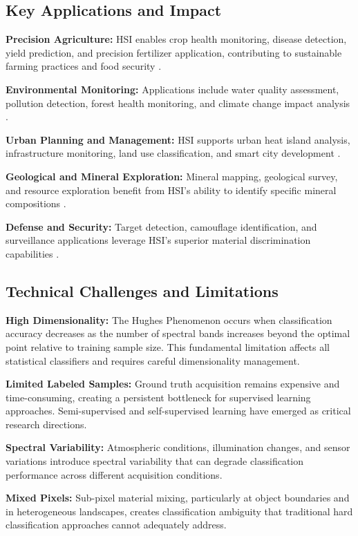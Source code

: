 \documentclass[journal]{IEEEtran}
\begin{document}
\subsection{Key Applications and Impact}

\textbf{Precision Agriculture:} HSI enables crop health monitoring, disease detection, yield prediction, and precision fertilizer application, contributing to sustainable farming practices and food security \cite{gewali2018machine}.

\textbf{Environmental Monitoring:} Applications include water quality assessment, pollution detection, forest health monitoring, and climate change impact analysis \cite{gewali2018machine}.

\textbf{Urban Planning and Management:} HSI supports urban heat island analysis, infrastructure monitoring, land use classification, and smart city development \cite{li2017deep}.

\textbf{Geological and Mineral Exploration:} Mineral mapping, geological survey, and resource exploration benefit from HSI's ability to identify specific mineral compositions \cite{roy2020hybridsn}.

\textbf{Defense and Security:} Target detection, camouflage identification, and surveillance applications leverage HSI's superior material discrimination capabilities \cite{roy2020hybridsn}.

\subsection{Technical Challenges and Limitations}

\textbf{High Dimensionality:} The Hughes Phenomenon occurs when classification accuracy decreases as the number of spectral bands increases beyond the optimal point relative to training sample size. This fundamental limitation affects all statistical classifiers and requires careful dimensionality management.

\textbf{Limited Labeled Samples:} Ground truth acquisition remains expensive and time-consuming, creating a persistent bottleneck for supervised learning approaches. Semi-supervised and self-supervised learning have emerged as critical research directions.

\textbf{Spectral Variability:} Atmospheric conditions, illumination changes, and sensor variations introduce spectral variability that can degrade classification performance across different acquisition conditions.

\textbf{Mixed Pixels:} Sub-pixel material mixing, particularly at object boundaries and in heterogeneous landscapes, creates classification ambiguity that traditional hard classification approaches cannot adequately address.
\end{document}
